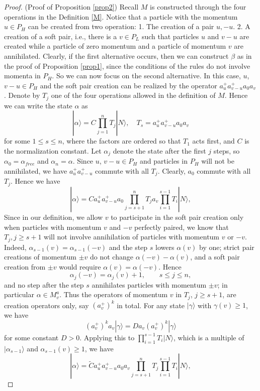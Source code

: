 \documentclass[11pt]{article}
\numberwithin{equation}{section}
\newcommand\al{{\alpha}}
\theoremstyle{definition}
\begin{document}
\begin{proof} (Proof of Proposition \ref{prop2}) Recall $M$ is constructed through the four operations in the Definition \ref{M}. Notice that
a particle with the momentum  $u \in P_H$ can  be created from two operation: 1. The creation of a pair
$u, -u$. 2. A creation of a soft pair, i.e., there is a $v \in P_L$ such that particles $u$ and $v-u$
are created while a particle of zero momentum and a particle of momentum $v$ are annihilated.
Clearly, if the first alternative occurs, then we can construct $\beta$ as in the proof of  Proposition \ref{prop1}, since the conditions of the rules do not involve momenta in $P_H$.
So we can now focus on the second alternative. In this case, $u$, $v-u\in P_H$
and the soft pair creation can be realized by the operator $a^+_{u} a^+_{v-u} a_0 a_v$. Denote by $T_j$ one of the four operations
allowed in the definition of $M$.   Hence we can write the state
$\alpha$ as
\[
|\alpha\rangle =     C     \prod_{j=1}^n  T_j |N\rangle, \quad
T_s= a^+_{u} a^+_{v-u} a_0 a_v
\]
for some $ 1 \le s \le n$, where the factors are ordered so that $T_1$ acts first, and $C$ is the normalization constant.
Let $\al_j$ denote the state after the first $j$ steps, so $\al_0=\al_{free}$ and $\al_n=\al$.
Since $u$, $v-u \in P_H$ and particles in $P_H$ will not be annihilated,
we have $a^+_{u} a^+_{v-u}$ commute with all $T_j$. Clearly, $a_0$ commute with all $T_j$. Hence we have
\[
|\alpha \rangle =   C a^+_{u} a^+_{v-u} a_0        \prod_{j=s+1}^n  T_j  a_v  \prod_{i=1}^{s-1} T_i |N\rangle,
\]
Since in our definition, we allow $v$ to participate in the soft pair creation only when particles with momentum $v$ and
$-v$ perfectly paired, we know that $T_j, j \ge s+1$ will not involve annihilation of particles with momentum $v$ or $-v$.
Indeed, $\al_{s-1}(v)=\al_{s-1}(-v)$ and the step $s$ lowers $\al(v)$ by one; strict pair creations of momentum $\pm v$ do not change $\al(-v)-\al(v)$,
and a soft pair creation from $\pm v$ would require $\al(v)=\al(-v)$. Hence
\[
\al_j(-v)=\al_j(v)+1, \qquad s\leq j\leq n,
\]
and no step after the step $s$ annihilates particles with momentum $\pm v$; in particular $\al\in M^a_v$.
Thus the operators of momentum $v$ in $T_j$, $j\geq s+1$, are creation operators only, say $(a_v^+)^k$ in total.
For any state $|\gamma\rangle$ with $\gamma(v)\geq1$, we have
\[
(a_v^+)^k a_v |\gamma\rangle =  D  a_v (a_v^+)^{k}  |\gamma\rangle
\]
for some constant $D>0$. Applying this to $\prod_{i=1}^{s-1} T_i |N\rangle$, which is a multiple of $|\al_{s-1}\rangle$ and $\al_{s-1}(v)\geq1$, we have
\[
|\alpha \rangle =   \widetilde C a^+_{u} a^+_{v-u} a_0 a_v       \prod_{j=s+1}^n  T_j    \prod_{i=1}^{s-1} T_i |N\rangle,
\]
\end{proof}
\end{document}
